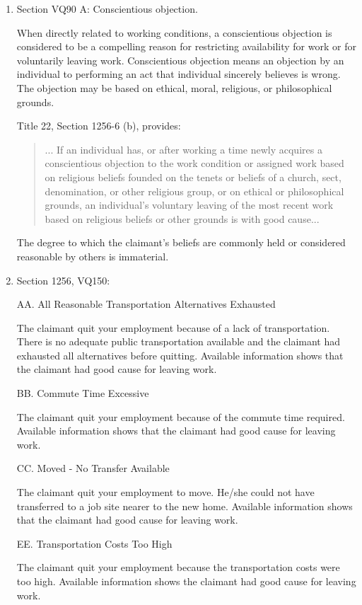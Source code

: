 \documentclass[12pt]{article}
\newcommand{\1}{\mathbf{1}}
\begin{document}
\begin{appendix}
\begin{enumerate}
\item Section VQ90 A: Conscientious objection.

When directly related to working conditions, a conscientious objection is considered to be a compelling reason for restricting availability for work or for voluntarily leaving work. Conscientious objection means an objection by an individual to performing an act that individual sincerely believes is wrong. The objection may be based on ethical, moral, religious, or philosophical grounds.

Title 22, Section 1256-6 (b), provides:
\begin{quotation} ... If an individual has, or after working a time newly acquires a conscientious objection to the work condition or assigned work based on religious beliefs founded on the tenets or beliefs of a church, sect, denomination, or other religious group, or on ethical or philosophical grounds, an individual's voluntary leaving of the most recent work based on religious beliefs or other grounds is with good cause...
\end{quotation}
The degree to which the claimant's beliefs are commonly held or considered reasonable by others is immaterial.

\item Section 1256, VQ150:

AA. All Reasonable Transportation Alternatives Exhausted

The claimant quit your employment because of a lack of transportation. There is no adequate public transportation available and the claimant had exhausted all alternatives before quitting. Available information shows that the claimant had good cause for leaving work.

BB. Commute Time Excessive

The claimant quit your employment because of the commute time required. Available information shows that the claimant had good cause for leaving work.

CC. Moved - No Transfer Available

The claimant quit your employment to move. He/she could not have transferred to a job site nearer to the new home. Available information shows that the claimant had good cause for leaving work.

EE. Transportation Costs Too High

The claimant quit your employment because the transportation costs were too high. Available information shows the claimant had good cause for leaving work.



\end{enumerate}
\end{appendix}
\end{document}
